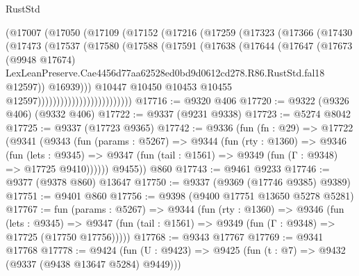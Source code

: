 \begin{lexlean}{RustStd}
\begin{coremodule}
                            (@17007
                              (@17050
                                (@17109
                                  (@17152
                                    (@17216
                                      (@17259
                                        (@17323
                                          (@17366
                                            (@17430
                                              (@17473
                                                (@17537
                                                  (@17580
                                                    (@17588
                                                      (@17591
                                                        (@17638
                                                          (@17644
                                                            (@17647
                                                              (@17673
                                                                (@9948 @17674)
                                                                LexLeanPreserve.Cae4456d77aa62528ed0bd9d0612cd278.R86.RustStd.fal18
                                                                @12597))
                                                            @16939)))
                                                      @10447
                                                      @10450
                                                      @10453
                                                      @10455
                                                      @12597)))))))))))))))))))))))))
@17716 := @9320 @406
@17720 := @9322 (@9326 @406) (@9332 @406)
@17722 := @9337 (@9231 @9338)
@17723 := @5274 @8042
@17725 := @9337 (@17723 @9365)
@17742 := @9336
    (fun (fn : @29) =>
    @17722
      (@9341
        (@9343
          (fun (params : @5267) =>
          @9344
            (fun (rty : @1360) =>
            @9346
              (fun (lets : @9345) =>
              @9347 (fun (tail : @1561) => @9349 (fun (Γ : @9348) => @17725 @9410))))))
        @9455))
    @860
@17743 := @9461 @9233
@17746 := @9377 (@9378 @860) @13647
@17750 := @9337 (@9369 (@17746 @9385) @9389)
@17751 := @9401 @860
@17756 := @9398 (@9400 @17751 @13650 @5278 @5281)
@17767 := fun (params : @5267) =>
  @9344
    (fun (rty : @1360) =>
    @9346
      (fun (lets : @9345) =>
      @9347 (fun (tail : @1561) => @9349 (fun (Γ : @9348) => @17725 (@17750 @17756)))))
@17768 := @9343 @17767
@17769 := @9341 @17768
@17778 := @9424
    (fun (U : @9423) => @9425 (fun (t : @7) => @9432 (@9337 (@9438 @13647 @5284) @9449)))

\end{coremodule}
\end{lexlean}
